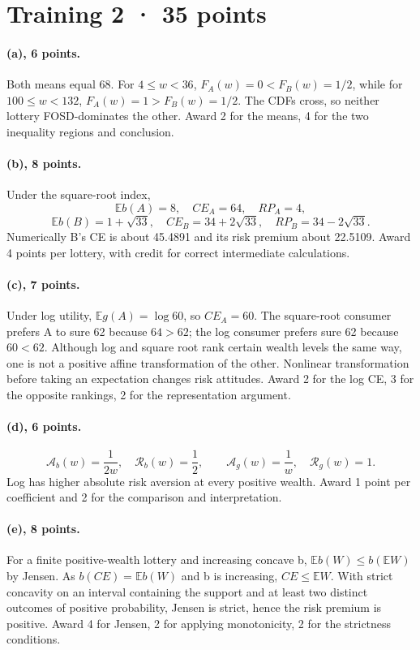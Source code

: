 \section*{Training 2 · 35 points}
\paragraph{(a), 6 points.}
Both means equal 68. For $4\le w<36$, $F_A(w)=0<F_B(w)=1/2$, while
for $100\le w<132$, $F_A(w)=1>F_B(w)=1/2$. The CDFs cross, so neither
lottery FOSD-dominates the other. Award 2 for the means, 4 for the two
inequality regions and conclusion.

\paragraph{(b), 8 points.}
Under the square-root index,
\[
 \mathbb E b(A)=8,\quad CE_A=64,\quad RP_A=4,
\]
\[
 \mathbb E b(B)=1+\sqrt{33},\quad
 CE_B=34+2\sqrt{33},\quad RP_B=34-2\sqrt{33}.
\]
Numerically B's CE is about 45.4891 and its risk premium about 22.5109.
Award 4 points per lottery, with credit for correct intermediate calculations.

\paragraph{(c), 7 points.}
Under log utility, $\mathbb E g(A)=\log60$, so $CE_A=60$.
The square-root consumer prefers A to sure 62 because $64>62$; the log
consumer prefers sure 62 because $60<62$. Although log and square root
rank certain wealth levels the same way, one is not a positive affine
transformation of the other. Nonlinear transformation before taking an
expectation changes risk attitudes. Award 2 for the log CE, 3 for the
opposite rankings, 2 for the representation argument.

\paragraph{(d), 6 points.}
\[
 \mathcal A_b(w)=\frac1{2w},\quad\mathcal R_b(w)=\frac12,
 \qquad
 \mathcal A_g(w)=\frac1w,\quad\mathcal R_g(w)=1.
\]
Log has higher absolute risk aversion at every positive wealth. Award
1 point per coefficient and 2 for the comparison and interpretation.

\paragraph{(e), 8 points.}
For a finite positive-wealth lottery and increasing concave b,
$\mathbb E b(W)\le b(\mathbb E W)$ by Jensen. As
$b(CE)=\mathbb E b(W)$ and b is increasing, $CE\le\mathbb E W$.
With strict concavity on an interval containing the support and at least
two distinct outcomes of positive probability, Jensen is strict, hence the
risk premium is positive. Award 4 for Jensen, 2 for applying monotonicity,
2 for the strictness conditions.

